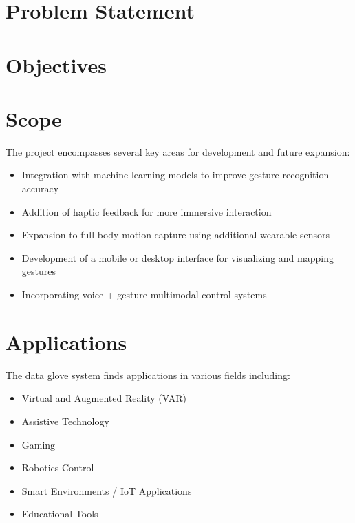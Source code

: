 \vspace{1.5\baselineskip} 

\section{Problem Statement}
\vspace{1.5\baselineskip} 

\section{Objectives}
\vspace{1.5\baselineskip} 

\section{Scope}
The project encompasses several key areas for development and future expansion:
\begin{itemize}
    \item Integration with machine learning models to improve gesture recognition accuracy
    \item Addition of haptic feedback for more immersive interaction
    \item Expansion to full-body motion capture using additional wearable sensors
    \item Development of a mobile or desktop interface for visualizing and mapping gestures
    \item Incorporating voice + gesture multimodal control systems
\end{itemize}
\vspace{1.5\baselineskip}
\section{Applications}
The data glove system finds applications in various fields including:
\begin{itemize}
    \item Virtual and Augmented Reality (VAR)
    \item Assistive Technology
    \item Gaming
    \item Robotics Control
    \item Smart Environments / IoT Applications
    \item Educational Tools
\end{itemize}



